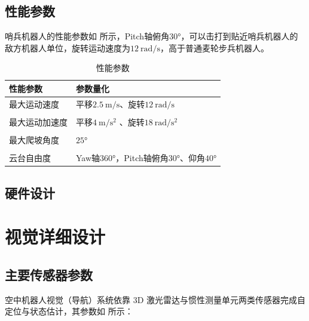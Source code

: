 \subsection{性能参数}

哨兵机器人的性能参数如 所示，Pitch轴俯角$\ang{30}$，可以击打到贴近哨兵机器人的敌方机器人单位，旋转运动速度为$\qty{12}{\radian\per\second}$，高于普通麦轮步兵机器人。

\begin{table}[hbtp!]
    \centering
    \begin{tabular}{ m{4cm}  m{9cm} }
    \toprule
      性能参数    &   参数量化  \\
     \midrule
     最大运动速度 & 平移$\qty{2.5}{\m\per\second}$、旋转$\qty{12}{\radian\per\second}$ \\ \\
     最大运动加速度  &  平移$\qty{4}{\m\per\s\squared}$ 、旋转$\qty{18}{\radian\per\s\squared}$   \\ \\
   
     最大爬坡角度   &   $\ang{25}$    \\ \\
     云台自由度 & Yaw轴$\ang{360}$，Pitch轴俯角$\ang{30}$、仰角$\ang{40}$ \\ 

    \toprule
    \end{tabular}
    \caption{性能参数}
    \label{tab:soldier_parameters}
\end{table}

\subsection{硬件设计}


\section{视觉详细设计}
\subsection{主要传感器参数}

空中机器人视觉（导航）系统依靠 3D 激光雷达与惯性测量单元两类传感器完成自定位与状态估计，其参数如 所示：

